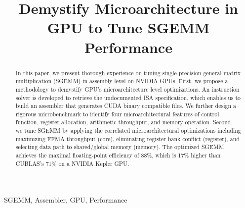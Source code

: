 \documentclass{sig-alternate-05-2015}
\begin{document}






\title{Demystify Microarchitecture in GPU to Tune SGEMM Performance}
\subtitle{}


\maketitle

\begin{abstract}
	In this paper, we present thorough experience on tuning single precision general matrix multiplication (SGEMM) in assembly level on NVIDIA GPUs. First, we propose a methodology to demystify GPU's microarchitecture level optimizations. An instruction solver is developed to retrieve the undocumented ISA specification, which enables us to build an assembler that generates CUDA binary compatible files. We further design a rigorous microbenchmark to identify four microarchitectural features of control function, register allocation, arithmetic throughput, and memory operation. Second, we tune SGEMM by applying the correlated microarchitectural optimizations including maximizing FFMA throughput (core), eliminating register bank conflict (register), and selecting data path to shared/global memory (memory). The optimized SGEMM achieves the maximal floating-point efficiency of 88\%, which is 17\% higher than CUBLAS's 71\% on a NVIDIA Kepler GPU.
\end{abstract}



\keywords
SGEMM, Assembler, GPU, Performance







%
%




\end{document}
